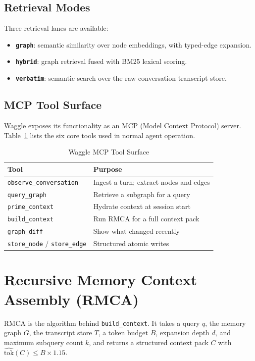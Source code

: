 \documentclass[conference]{IEEEtran}
\begin{document}
\subsection{Retrieval Modes}

Three retrieval lanes are available:
\begin{itemize}
\item \textbf{\texttt{graph}}: semantic similarity over node embeddings, with typed-edge expansion.
\item \textbf{\texttt{hybrid}}: graph retrieval fused with BM25 lexical scoring.
\item \textbf{\texttt{verbatim}}: semantic search over the raw conversation transcript store.
\end{itemize}

\subsection{MCP Tool Surface}

Waggle exposes its functionality as an MCP (Model Context Protocol) server.
Table~\ref{tab:tools} lists the six core tools used in normal agent operation.

\begin{table}[htbp]
\caption{Waggle MCP Tool Surface}
\label{tab:tools}
\centering
\begin{tabular}{ll}
\toprule
\textbf{Tool} & \textbf{Purpose} \\
\midrule
\texttt{observe\_conversation} & Ingest a turn; extract nodes and edges \\
\texttt{query\_graph} & Retrieve a subgraph for a query \\
\texttt{prime\_context} & Hydrate context at session start \\
\texttt{build\_context} & Run RMCA for a full context pack \\
\texttt{graph\_diff} & Show what changed recently \\
\texttt{store\_node} / \texttt{store\_edge} & Structured atomic writes \\
\bottomrule
\end{tabular}
\end{table}

\section{Recursive Memory Context Assembly (RMCA)}

RMCA is the algorithm behind \texttt{build\_context}. It takes a query $q$, the memory graph
$G$, the transcript store $T$, a token budget $B$, expansion depth $d$, and maximum subquery
count $k$, and returns a structured context pack $C$ with
$\widehat{\text{tok}}(C) \leq B \times 1.15$.
\end{document}
